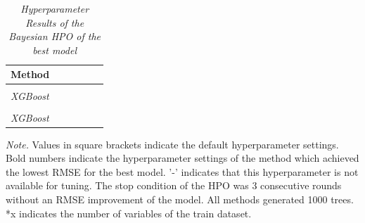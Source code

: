\documentclass[12pt,a4paper]{article}
\begin{document}
\begin{table}[!htbp]
\scriptsize
\centering
\captionsetup{labelsep=newline, justification=centering}
  \begin{threeparttable}
       \caption{\textit{Hyperparameter Results of the Bayesian HPO of the best model }} 
    \begin{tabular}{*{6}{l}}
        \toprule
         {Method}&   &  &  &  &   \\
        \midrule
        & & & & &  \\
        \midrule
        \textit{XGBoost}  &
         & 
         & 
          &
        &
\\
        \midrule
        & & & &  & \\ 
        \midrule
        \textit{XGBoost}  &
         & 
         & 
          &
        &
\\
        \bottomrule
     \end{tabular}
    \begin{tablenotes}[flushleft]
      \small
      \item \textit{Note.} Values in square brackets indicate the default hyperparameter settings. Bold numbers indicate the hyperparameter settings of the method which achieved the lowest RMSE for the best model. '-' indicates that this hyperparameter is not available for tuning. The stop condition of the HPO was 3 consecutive rounds without an RMSE improvement of the model. All methods generated 1000 trees. *x indicates the number of variables of the train dataset. 
    \end{tablenotes}
      \label{tab:HPO_results_best_mod_short}
  \end{threeparttable}
\end{table}
\end{document}

